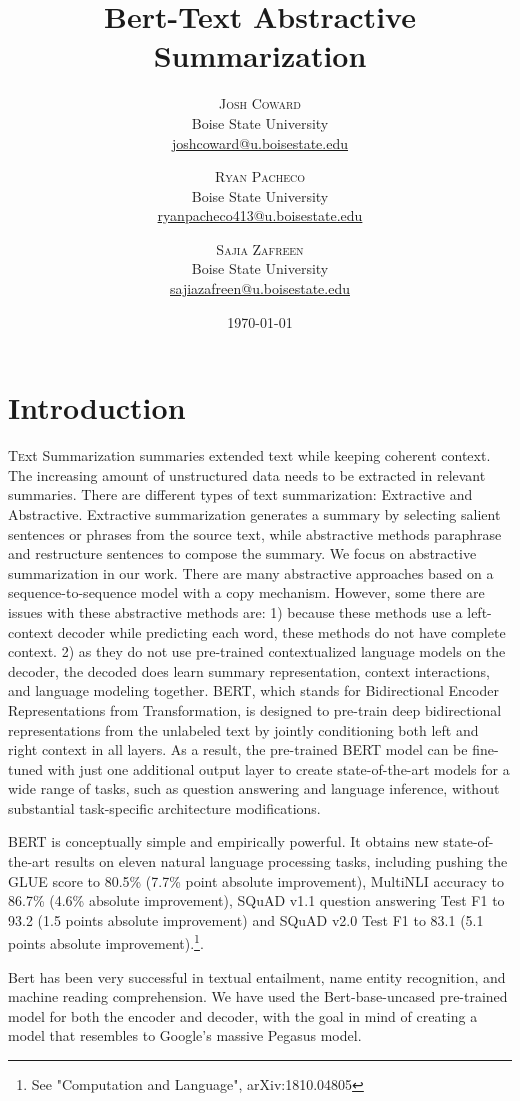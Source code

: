 \documentclass[twoside,twocolumn]{article}
\title{Bert-Text Abstractive Summarization} %
\author{%
\textsc{Josh Coward}\\[1ex] %
\normalsize Boise State University \\ %
\normalsize \href{mailto:joshcoward@u.boisestate.edu}{joshcoward@u.boisestate.edu} %
\and %
\textsc{Ryan Pacheco}\\[1ex] %
\normalsize Boise State University \\ %
\normalsize \href{mailto:ryanpacheco413@u.boisestate.edu}{ryanpacheco413@u.boisestate.edu} %
\and %
\textsc{Sajia Zafreen}\\[1ex] %
\normalsize Boise State University \\ %
\normalsize \href{mailto:sajiazafreen@u.boisestate.edu}{sajiazafreen@u.boisestate.edu} %
}
\date{\today} %
\begin{document}
\maketitle



\section{Introduction}
\lettrine[nindent=0em,lines=3]

Text Summarization summaries extended text while keeping coherent context. The increasing amount of unstructured data needs to be extracted in relevant summaries. There are different types of text summarization: Extractive and Abstractive. Extractive summarization generates a summary by selecting salient sentences or phrases from the source text, while abstractive methods paraphrase and restructure sentences to compose the summary. We focus on abstractive summarization in our work. There are many abstractive approaches based on a sequence-to-sequence model with a copy mechanism. However, some there are issues with these abstractive methods are: 1) because these methods use a left-context decoder while predicting each word, these methods do not have complete context. 2) as they do not use pre-trained contextualized language models on the decoder, the decoded does learn summary representation, context interactions, and language modeling together. 
BERT, which stands for Bidirectional Encoder Representations from Transformation, is designed to pre-train deep bidirectional representations from the unlabeled text by jointly conditioning both left and right context in all layers. As a result, the pre-trained BERT model can be fine-tuned with just one additional output layer to create state-of-the-art models for a wide range of tasks, such as question answering and language inference, without substantial task-specific architecture modifications.\par
BERT is conceptually simple and empirically powerful. It obtains new state-of-the-art results on eleven natural language processing tasks, including pushing the GLUE score to 80.5\% (7.7\% point absolute improvement), MultiNLI accuracy to 86.7\% (4.6\% absolute improvement), SQuAD v1.1 question answering Test F1 to 93.2 (1.5 points absolute improvement) and SQuAD v2.0 Test F1 to 83.1 (5.1 points absolute improvement).\footnote{See "Computation and Language", arXiv:1810.04805 }. \par
Bert has been very successful in textual entailment, name entity recognition, and machine reading comprehension. We have used the Bert-base-uncased pre-trained model for both the encoder and decoder, with the goal in mind of creating a model that resembles to Google's massive Pegasus model.
\end{document}

